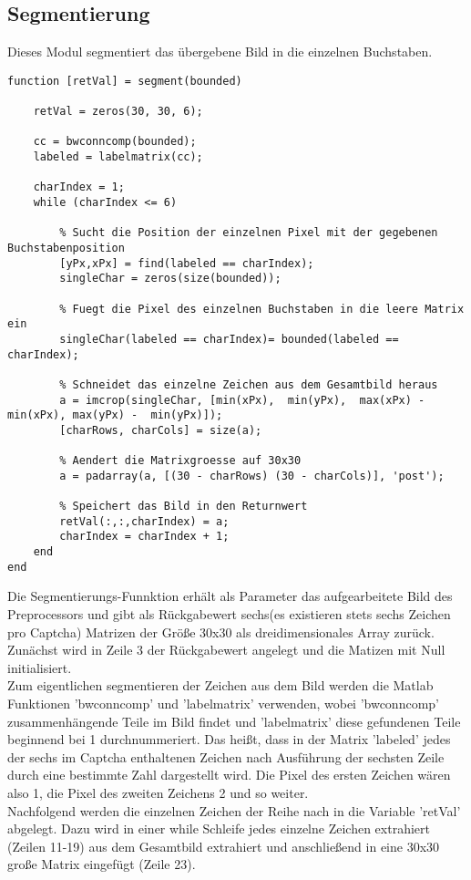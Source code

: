 \subsection{Segmentierung}
Dieses Modul segmentiert das übergebene Bild in die einzelnen Buchstaben.
\begin{lstlisting}
function [retVal] = segment(bounded)

    retVal = zeros(30, 30, 6);

    cc = bwconncomp(bounded);
    labeled = labelmatrix(cc);
  
    charIndex = 1;
    while (charIndex <= 6)

        % Sucht die Position der einzelnen Pixel mit der gegebenen Buchstabenposition
        [yPx,xPx] = find(labeled == charIndex);
        singleChar = zeros(size(bounded)); 

        % Fuegt die Pixel des einzelnen Buchstaben in die leere Matrix ein
        singleChar(labeled == charIndex)= bounded(labeled == charIndex); 

        % Schneidet das einzelne Zeichen aus dem Gesamtbild heraus
        a = imcrop(singleChar, [min(xPx),  min(yPx),  max(xPx) - min(xPx), max(yPx) -  min(yPx)]);
        [charRows, charCols] = size(a);

        % Aendert die Matrixgroesse auf 30x30
        a = padarray(a, [(30 - charRows) (30 - charCols)], 'post');
        
        % Speichert das Bild in den Returnwert
        retVal(:,:,charIndex) = a;
        charIndex = charIndex + 1;
    end
end
\end{lstlisting}
Die Segmentierungs-Funnktion erhält als Parameter das aufgearbeitete Bild des Preprocessors und gibt als Rückgabewert sechs(es existieren stets sechs Zeichen pro Captcha) Matrizen der Größe 30x30 als dreidimensionales Array zurück.\\
Zunächst wird in Zeile 3 der Rückgabewert angelegt und die Matizen mit Null initialisiert.\\
Zum eigentlichen segmentieren der Zeichen aus dem Bild werden die Matlab Funktionen 'bwconncomp' und 'labelmatrix' verwenden, wobei 'bwconncomp' zusammenhängende Teile im Bild findet und 'labelmatrix' diese gefundenen Teile beginnend bei 1 durchnummeriert. Das heißt, dass in der Matrix 'labeled' jedes der sechs im Captcha enthaltenen Zeichen nach Ausführung der sechsten Zeile durch eine bestimmte Zahl dargestellt wird. Die Pixel des ersten Zeichen wären also 1, die Pixel des zweiten Zeichens 2 und so weiter.\\
Nachfolgend werden die einzelnen Zeichen der Reihe nach in die Variable 'retVal' abgelegt. Dazu wird in einer while Schleife jedes einzelne Zeichen extrahiert (Zeilen 11-19) aus dem Gesamtbild extrahiert und anschließend in eine 30x30 große Matrix eingefügt (Zeile 23). 
\newpage
